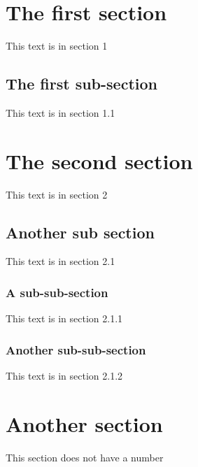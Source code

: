 \documentclass[11pt, letter]{article}
\begin{document}
    \section{The first section}
    This text is in section 1

        \subsection{The first sub-section}
        This text is in section 1.1

    \section{The second section}
    This text is in section 2

        \subsection{Another sub section}
        This text is in section 2.1

            \subsubsection{A sub-sub-section}
            This text is in section 2.1.1
            \subsubsection{Another sub-sub-section}
            This text is in section 2.1.2

    \section*{Another section}This section does not have a number
\end{document}
